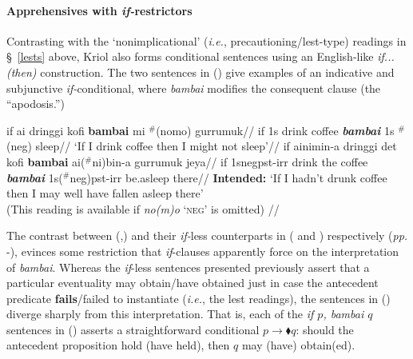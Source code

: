 \paragraph[cond]{Apprehensives with \textit{if-}restrictors}\label{ifs}
Contrasting with the `nonimplicational' (\textit{i.e.}, {precautioning/\sc lest}-type) readings in \S~\ref{lests} above, Kriol also forms conditional sentences using an English-like \textit{if...(then)} construction. The two sentences in (\nextx) give examples of an indicative and subjunctive \textit{if-}conditional, where \textit{bambai} modifies the consequent clause (the ``apodosis.'') 


\pex\a{}\begingl %
\gla if ai dringgi kofi \textbf{bambai} mi $^\#$(nomo) gurrumuk//
\glb if 1s drink coffee \textit{\textbf{bambai}} 1s $^\#$({\sc neg}) sleep//
\glft `If I drink coffee then I might not sleep'\trailingcitation{[AJ~23022017]}//
\endgl
\a{}\begingl\gla if ai\textdblhyphen{}ni\textdblhyphen{}min-a dringgi det kofi \textbf{bambai} ai($^\#$\textdblhyphen{}ni)\textdblhyphen{}bin-a gurrumuk jeya//
\glb if 1s{\sc\textdblhyphen{}neg\textdblhyphen{}pst-irr} drink the coffee \textit{\textbf{bambai}} 1s{\sc($^\#$\textdblhyphen{}neg)\textdblhyphen{}pst-irr} be.asleep there//
\glft\textbf{Intended:} `If I hadn't drunk coffee then I may well have fallen asleep there'\\(This reading is available if \textit{\textdblhyphen no(m)o} `\textsc{neg}' is omitted) \trailingcitation{[GT~16032017]}//
\endgl\xe




The contrast between (,) and their \textit{if-}less counterparts in ( and ) respectively (\textit{pp.} -), evinces some restriction that \textit{if}-clauses apparently force on the interpretation of \textit{bambai}. Whereas the \textit{if}-less sentences presented previously assert that a particular eventuality may obtain/have obtained just in case the antecedent predicate \textbf{fails}/failed to instantiate (\textit{i.e.}, the {\sc lest} readings), the sentences in () diverge sharply from this interpretation. That is, each of the \textit{if $ p $, bambai $ q $} sentences in () asserts a straightforward conditional $p\to\blacklozenge q$: should the antecedent proposition hold (have held), then $q$ may (have) obtain(ed). 


